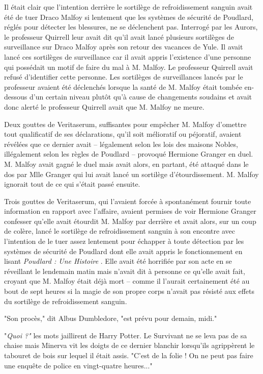 Il était clair que l'intention derrière le sortilège de refroidissement sanguin avait été de tuer Draco Malfoy si lentement que les systèmes de sécurité de Poudlard, réglés pour détecter les blessures, ne se déclenchent pas. Interrogé par les Aurors, le professeur Quirrell leur avait dit qu'il avait lancé plusieurs sortilèges de surveillance sur Draco Malfoy après son retour des vacances de Yule. Il avait lancé ces sortilèges de surveillance car il avait appris l'existence d'une personne qui possédait un motif de faire du mal à M. Malfoy. Le professeur Quirrell avait refusé d'identifier cette personne. Les sortilèges de surveillances lancés par le professeur avaient été déclenchés lorsque la santé de M. Malfoy était tombée en-dessous d'un certain niveau plutôt qu'à cause de changements soudains et avait donc alerté le professeur Quirrell avait que M. Malfoy ne meure.

Deux gouttes de Veritaserum, suffisantes pour empêcher M. Malfoy d'omettre tout qualificatif de ses déclarations, qu'il soit mélioratif ou péjoratif, avaient révélées que ce dernier avait – légalement selon les lois des maisons Nobles, illégalement selon les règles de Poudlard – provoqué Hermione Granger en duel. M. Malfoy avait gagné le duel mais avait alors, en partant, été attaqué dans le dos par Mlle Granger qui lui avait lancé un sortilège d'étourdissement. M. Malfoy ignorait tout de ce qui s'était passé ensuite.

Trois gouttes de Veritaserum, qui l'avaient forcée à spontanément fournir toute information en rapport avec l'affaire, avaient permises de voir Hermione Granger confesser qu'elle avait étourdit M. Malfoy par derrière et avait alors, sur un coup de colère, lancé le sortilège de refroidissement sanguin à son encontre avec l'intention de le tuer assez lentement pour échapper à toute détection par les systèmes de sécurité de Poudlard dont elle avait appris le fonctionnement en lisant \emph{Poudlard : Une Histoire} . Elle avait été horrifiée par son acte en se réveillant le lendemain matin mais n'avait dit à personne ce qu'elle avait fait, croyant que M. Malfoy était déjà mort – comme il l'aurait certainement été au bout de sept heures si la magie de son propre corps n'avait pas résisté aux effets du sortilège de refroidissement sanguin.

"Son procès," dit Albus Dumbledore, "est prévu pour demain, midi."

"\emph{Quoi ?"}  les mots jaillirent de Harry Potter. Le Survivant ne se leva pas de sa chaise mais Minerva vit les doigts de ce dernier blanchir lorsqu'ils agrippèrent le tabouret de bois sur lequel il était assis. "C'est de la folie ! On ne peut pas faire une enquête de police en vingt-quatre heures..."

